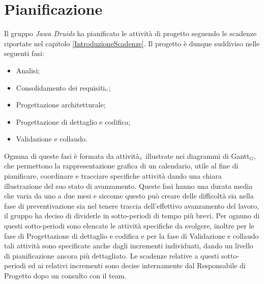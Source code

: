 \chapter{Pianificazione}\label{Pianificazione}
Il gruppo \textit{Jawa Druids} ha pianificato le attività di progetto seguendo le scadenze riportate nel capitolo \ref{IntroduzioneScadenze}. Il progetto è dunque suddiviso nelle seguenti fasi:
\begin{itemize}
	\item Analisi;
	\item Consolidamento dei requisiti$_{\scaleto{G}{3pt}}$;
	\item Progettazione architetturale;
	\item Progettazione di dettaglio e codifica;
	\item Validazione e collaudo.
\end{itemize}
Ognuna di queste fasi è formata da attività$_{\scaleto{G}{3pt}}$ illustrate nei diagrammi di Gantt$_G$, che permettono la rappresentazione grafica di un calendario, utile al fine di pianificare, coordinare e tracciare specifiche attività dando una chiara illustrazione del suo stato di avanzamento.
Queste fasi hanno una durata media che varia da uno a due mesi e siccome questo può creare delle difficoltà sia nella fase di preventivazione sia nel tenere traccia dell'effettivo avanzamento del lavoro, il gruppo ha deciso di dividerle in sotto-periodi di tempo più brevi.
Per ognuno di questi sotto-periodi sono elencate le attività specifiche da svolgere, inoltre per le fase di Progettazione di dettaglio e codifica e per la fase di Validazione e collaudo tali attività sono specificate anche dagli incrementi individuati, dando un livello di pianificazione ancora più dettagliato.
Le scadenze relative a questi sotto-periodi ed ai relativi incrementi sono decise internamente dal Responsabile di Progetto dopo un consulto con il team.
